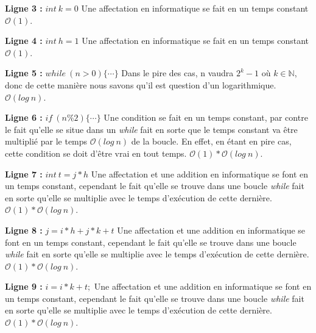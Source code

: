 \documentclass[12pt]{article}
\begin{document}
        \noindent \textbf{Ligne 3 :} \( int \: k = 0 \) \newline
        Une affectation en informatique se fait en un temps constant
        \( \mathcal{O}(1) \). \newline
        
        \noindent \textbf{Ligne 4 :} \( int \: h = 1 \) \newline
        Une affectation en informatique se fait en un temps constant
        \( \mathcal{O}(1) \). \newline
        
        \noindent \textbf{Ligne 5 :} \( while \: (n>0) \{ \cdots \} \) \newline
        Dans le pire des cas, n vaudra \( 2^k - 1 \) où \(k \in \mathbb{N} \), donc de cette manière nous         savons qu'il est question d'un logarithmique. 
        \( \mathcal{O}(log \: n) \). \newline

        \noindent \textbf{Ligne 6 :}  \( if \: (n\%2)\{ \cdots \} \) \newline
        Une condition se fait en un temps constant, par contre le fait qu'elle se situe dans un \textit{while} fait en sorte que le temps constant va être multiplié par le temps \( \mathcal{O}(log \: n) \) de la boucle. En effet, en étant en pire cas, cette condition se doit d'être vrai en tout temps.
        \( \mathcal{O}(1)*\mathcal{O}(log \: n) \). \newline

        \noindent \textbf{Ligne 7 :} \( int \: t = j*h \) \newline
        Une affectation et une addition en informatique se font en un temps constant, cependant le fait qu'elle se trouve dans une boucle \textit{while} fait en sorte qu'elle se multiplie avec le temps d'exécution de cette dernière.
        \( \mathcal{O}(1)*\mathcal{O}(log \: n) \). \newline

        \noindent \textbf{Ligne 8 :} \( j = i*h + j*k + t \) \newline
  	    Une affectation et une addition en informatique se font en un temps constant, cependant le fait qu'elle se trouve dans une boucle \textit{while} fait en sorte qu'elle se multiplie avec le temps d'exécution de cette dernière.
        \( \mathcal{O}(1)*\mathcal{O}(log \: n) \). \newline
    
        \noindent \textbf{Ligne 9 :} \( i = i*k + t; \) \newline
  	    Une affectation et une addition en informatique se font en un temps constant, cependant le fait qu'elle se trouve dans une boucle \textit{while} fait en sorte qu'elle se multiplie avec le temps d'exécution de cette dernière.
        \( \mathcal{O}(1)*\mathcal{O}(log \: n) \). \newline
        
\end{document}
